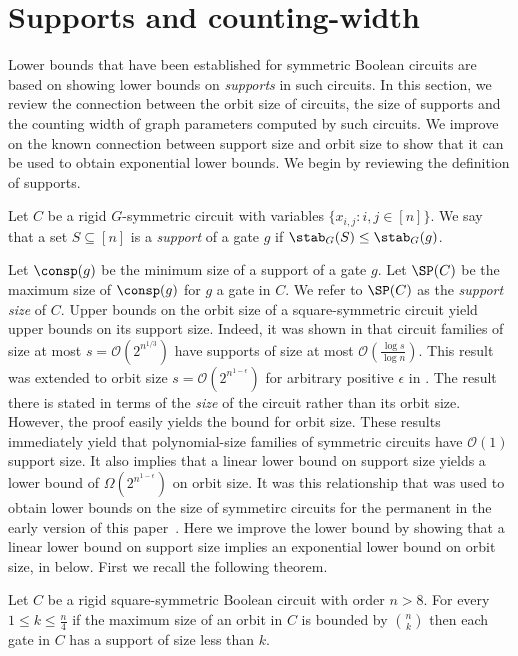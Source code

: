 \documentclass{toc}
\begin{document}
\section{Supports and counting-width}\label{sec:supports}
Lower bounds that have been established for symmetric Boolean circuits are based on showing lower bounds on \emph{supports} in such circuits.  In this section, we review the connection between the orbit size of circuits, the size of supports and the counting width of graph parameters computed by such circuits.  We improve on the known connection between support size and orbit size to show that it can be used to obtain exponential lower bounds.  We begin by reviewing the definition of supports.
\begin{definition}
  Let $C$ be a rigid $G$-symmetric circuit with variables $\{x_{i, j}: i, j \in
  [n]\}$. We say that
  a set $S \subseteq [n]$ is a \emph{support} of a gate $g$ if
  $\stab_G(S) \leq \stab_G(g)$.
\end{definition}
Let $\consp(g)$ be the minimum size of a support of a gate $g$. Let $\SP(C)$ be
the maximum size of $\consp(g)$ for $g$ a gate in $C$.  We refer to $\SP(C)$ as the \emph{support size} of $C$.
Upper bounds on the orbit size of a square-symmetric circuit yield upper bounds on its support size.  Indeed, it was shown in \cite[Theorem~4]{AndersonD17} that circuit families of size at most $s = \mathcal{O}(2^{n^{1/3}})$ have supports of size at most $\mathcal{O}(\frac{\log s}{\log n})$.   This result was extended to orbit size $s = \mathcal{O}(2^{n^{1-\epsilon}})$ for arbitrary positive $\epsilon$ in \cite[Theorem~1]{AtseriasDO19}.  The result there is stated in terms of the
\emph{size} of the circuit rather than its orbit size.  However, the
proof easily yields the bound for orbit size.  These results
immediately yield that polynomial-size families of symmetric circuits
have $\mathcal{O}(1)$ support size.  It also implies that a linear
lower bound on support size yields a lower bound of
$\Omega(2^{n^{1-\epsilon}})$ on orbit size.  It was this relationship
that was used to obtain lower bounds on the size of symmetirc circuits
for the permanent in the early version of this paper~\cite{conf-version}.
Here we improve the lower bound by showing that a linear lower bound
on support size implies an exponential lower bound on orbit size, in
 below.  First we recall the
following theorem.
\begin{theorem}
  Let $C$ be a rigid square-symmetric Boolean circuit with order $n > 8$. For
  every $1 \leq k \leq \frac{n}{4}$ if the maximum size of an orbit in $C$ is
  bounded by $\binom{n}{k}$ then each gate in $C$ has a support of size less
  than $k$.
  \label{thm:support-theorem-general}
\end{theorem}
\end{document}
